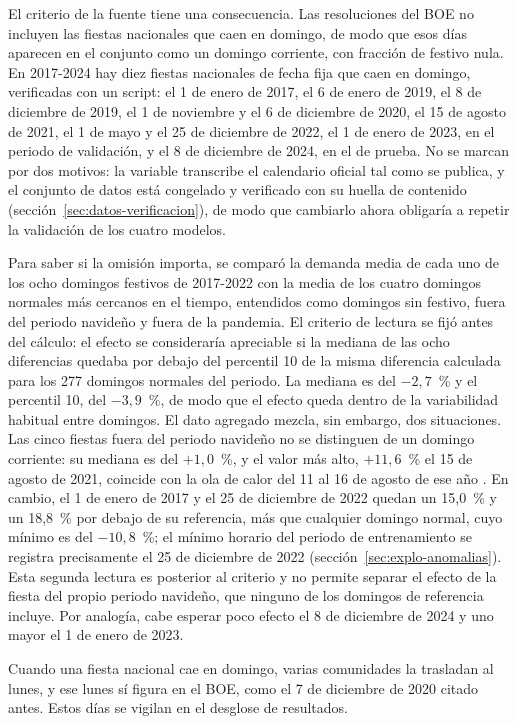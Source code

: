 El criterio de la fuente tiene una consecuencia. Las resoluciones del BOE no
incluyen las fiestas nacionales que caen en domingo, de modo que esos días
aparecen en el conjunto como un domingo corriente, con fracción de festivo
nula. En 2017-2024 hay diez fiestas nacionales de fecha fija que caen en
domingo, verificadas con un script: el 1 de enero de 2017, el 6 de enero de
2019, el 8 de diciembre de 2019, el 1 de noviembre y el 6 de diciembre de
2020, el 15 de agosto de 2021, el 1 de mayo y el 25 de diciembre de 2022, el
1 de enero de 2023, en el periodo de validación, y el 8 de diciembre de
2024, en el de prueba. No se marcan por dos motivos: la variable transcribe
el calendario oficial tal como se publica, y el conjunto de datos está
congelado y verificado con su huella de contenido
(sección~\ref{sec:datos-verificacion}), de modo que cambiarlo ahora
obligaría a repetir la validación de los cuatro modelos.

Para saber si la omisión importa, se comparó la demanda media de cada uno de
los ocho domingos festivos de 2017-2022 con la media de los cuatro domingos
normales más cercanos en el tiempo, entendidos como domingos sin festivo,
fuera del periodo navideño y fuera de la pandemia. El criterio de lectura se
fijó antes del cálculo: el efecto se consideraría apreciable si la mediana
de las ocho diferencias quedaba por debajo del percentil 10 de la misma
diferencia calculada para los 277 domingos normales del periodo. La mediana
es del $-2{,}7$~\% y el percentil 10, del $-3{,}9$~\%, de modo que el efecto
queda dentro de la variabilidad habitual entre domingos. El dato agregado
mezcla, sin embargo, dos situaciones. Las cinco fiestas fuera del periodo
navideño no se distinguen de un domingo corriente: su mediana es del
$+1{,}0$~\%, y el valor más alto, $+11{,}6$~\% el 15 de agosto de 2021,
coincide con la ola de calor del 11 al 16 de agosto de ese año
\parencite{gutierrez2021olacalor}. En cambio, el 1 de enero de 2017 y el 25
de diciembre de 2022 quedan un 15,0~\% y un 18,8~\% por debajo de su
referencia, más que cualquier domingo normal, cuyo mínimo es del
$-10{,}8$~\%; el mínimo horario del periodo de entrenamiento se registra
precisamente el 25 de diciembre de 2022
(sección~\ref{sec:explo-anomalias}). Esta segunda lectura es posterior al
criterio y no permite separar el efecto de la fiesta del propio periodo
navideño, que ninguno de los domingos de referencia incluye. Por analogía,
cabe esperar poco efecto el 8 de diciembre de 2024 y uno mayor el 1 de enero
de 2023.

Cuando una fiesta nacional cae en domingo, varias comunidades la trasladan al
lunes, y ese lunes sí figura en el BOE, como el 7 de diciembre de 2020
citado antes. Estos días se vigilan en el desglose de resultados.

